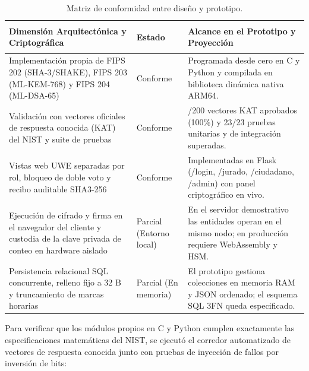 \begin{table}[!htbp]
	\centering
	\renewcommand{\arraystretch}{1.2}
	\footnotesize
	\begin{tabularx}{\textwidth}{|>{\raggedright\arraybackslash}p{6.2cm}|>{\bfseries\raggedright\arraybackslash}p{2.4cm}|>{\raggedright\arraybackslash}X|}
		\hline
		\textbf{Dimensión Arquitectónica y Criptográfica} & \textbf{Estado} & \textbf{Alcance en el Prototipo y Proyección} \\
		\hline
		Implementación propia de FIPS 202 (SHA-3/SHAKE), FIPS 203 (ML-KEM-768) y FIPS 204 (ML-DSA-65) & Conforme & Programada desde cero en C y Python y compilada en biblioteca dinámica nativa ARM64. \\
		\hline
		Validación con vectores oficiales de respuesta conocida (KAT) del NIST y suite de pruebas & Conforme & 200/200 vectores KAT aprobados (100\%) y 23/23 pruebas unitarias y de integración superadas. \\
		\hline
		Vistas web UWE separadas por rol, bloqueo de doble voto y recibo auditable SHA3-256 & Conforme & Implementadas en Flask (/login, /jurado, /ciudadano, /admin) con panel criptográfico en vivo. \\
		\hline
		Ejecución de cifrado y firma en el navegador del cliente y custodia de la clave privada de conteo en hardware aislado & Parcial (Entorno local) & En el servidor demostrativo las entidades operan en el mismo nodo; en producción requiere WebAssembly y HSM. \\
		\hline
		Persistencia relacional SQL concurrente, relleno fijo a 32 B y truncamiento de marcas horarias & Parcial (En memoria) & El prototipo gestiona colecciones en memoria RAM y JSON ordenado; el esquema SQL 3FN queda especificado. \\
		\hline
	\end{tabularx}
	\caption{Matriz de conformidad entre diseño y prototipo.}
	\label{tab:conformidad_prototipo_diseno}
	\par{}
\end{table}

Para verificar que los módulos propios en C y Python cumplen exactamente las especificaciones matemáticas del NIST, se ejecutó el corredor automatizado de vectores de respuesta conocida junto con pruebas de inyección de fallos por inversión de bits:


